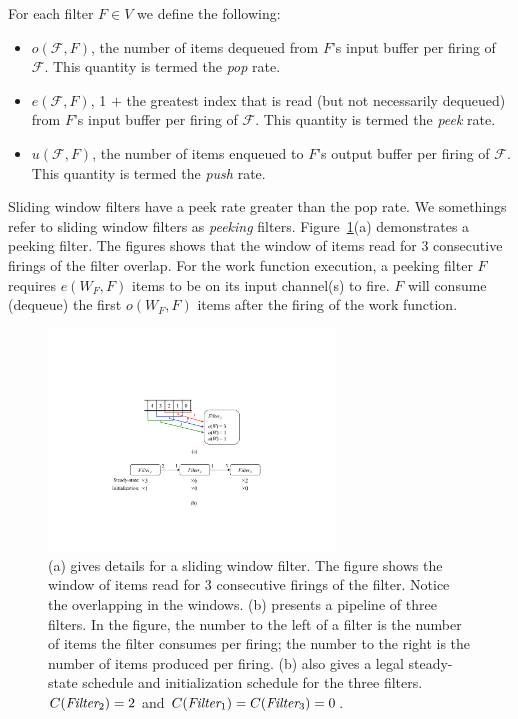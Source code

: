 For each filter $F \in V$ we define the following:
\begin{itemize}

\item $o(\mathcal{F}, F)$, the number of items dequeued from $F$'s
input buffer per firing of $\mathcal{F}$.  This quantity is termed the
{\it pop} rate.

\item $e(\mathcal{F}, F)$, 1 $+$ the greatest index that is read (but
  not necessarily dequeued) from $F$'s input buffer per firing of
  $\mathcal{F}$.  This quantity is termed the {\it peek} rate.

\item $u(\mathcal{F}, F)$, the number of items enqueued to $F$'s
output buffer per firing of $\mathcal{F}$.  This quantity is termed
the {\it push} rate.

\end{itemize}

\noindent Sliding window filters have a peek rate greater than the pop
rate.  We somethings refer to sliding window filters as {\it peeking}
filters. Figure~\ref{fig:pipeline-example}(a)
demonstrates a peeking filter.  The figures shows that the window of
items read for 3 consecutive firings of the filter overlap.  For the
work function execution, a peeking filter $F$ requires $e(W_F, F)$
items to be on its input channel(s) to fire.  $F$ will consume
(dequeue) the first $o(W_F, F)$ items after the firing of the work function.

\begin{figure}[t]
\centering
\includegraphics[width=3.0in]{figures/pipeline-example.pdf}
\caption[A pipeline of three filters with schedules.]{ (a) gives
  details for a sliding window filter.  The figure
  shows the window of items read for 3 consecutive firings of the
  filter.  Notice the overlapping in the windows.  (b) presents a pipeline of
  three filters.  In the figure, the number to the left of a filter is
  the number of items the filter consumes per firing; the number to
  the right is the number of items produced per firing.  (b) also gives a
  legal steady-state schedule and initialization schedule for the
  three filters. $C(\mbox{\it Filter}_2) = 2$ and
$C(\mbox{\it Filter}_1) = C(\mbox{\it Filter}_3) = 0$. 
  \label{fig:pipeline-example}}
\end{figure}

